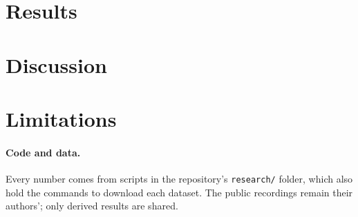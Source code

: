 \documentclass[11pt]{article}
\begin{document}
\section{Results}


\section{Discussion}


\section{Limitations}


\paragraph{Code and data.} Every number comes from scripts in the repository's \texttt{research/} folder, which also hold the commands to download each dataset. The public recordings remain their authors'; only derived results are shared.



\end{document}
